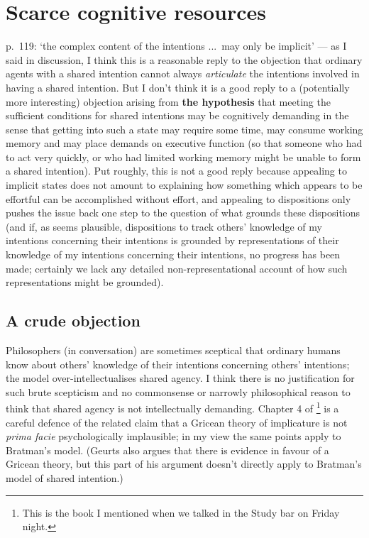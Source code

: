 \documentclass[12pt,letterpaper]{extarticle}
\begin{document}
\section{Scarce cognitive resources}
p.\ 119: `the complex content of the intentions ...\ may only be implicit' --- as I said in discussion, I think this is a reasonable reply to the objection that ordinary agents with a shared intention cannot always \emph{articulate} the intentions involved in having a shared intention.  
But I don't think it is a good reply to a (potentially more interesting) objection arising from \textbf{the hypothesis} that meeting the sufficient conditions for shared intentions may be cognitively demanding in the sense that  getting into such a state may require some time, may consume working memory and may place demands on executive function (so that someone who had to act very quickly, or who had limited working memory might be unable to form a shared intention).
Put roughly, this is not a good reply because appealing to implicit states does not amount to explaining how something which appears to be effortful can be accomplished without effort, and appealing to dispositions only pushes the issue back one step to the question of what grounds these dispositions (and if, as seems plausible, dispositions to track others' knowledge of my intentions concerning their intentions is grounded by representations of their knowledge of my intentions concerning their intentions, no progress has been made; certainly we lack any detailed non-representational account of how such representations might be grounded).


\subsection{A crude objection}
Philosophers (in conversation) are sometimes sceptical that ordinary humans know about others' knowledge of their intentions concerning others' intentions; the model over-intellectualises shared agency.
I think there is no justification for such brute scepticism and no commonsense or narrowly philosophical reason to think that shared agency is not intellectually demanding.
Chapter 4 of \citet{geurts_quantity_2011}\footnote{This is the book I mentioned when we talked in the Study bar on Friday night.}
is a careful defence of the related claim that a Gricean theory of implicature is not \emph{prima facie} psychologically implausible;  in my view the same points apply to Bratman's model.
(Geurts also argues that there is evidence in favour of a Gricean theory, but this part of his argument doesn't directly apply to Bratman's model of shared intention.)
\end{document}
